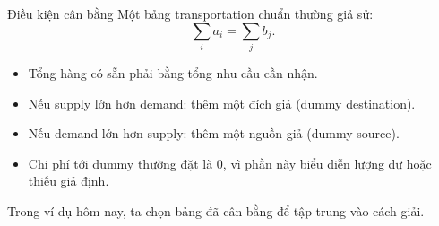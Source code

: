 \documentclass[10pt]{beamer}
\begin{document}
\begin{frame}{Điều kiện cân bằng}
    Một bảng transportation chuẩn thường giả sử:
    \[
        \sum_i a_i = \sum_j b_j.
    \]

    \begin{itemize}
        \item Tổng hàng có sẵn phải bằng tổng nhu cầu cần nhận.
        \item Nếu supply lớn hơn demand: thêm một đích giả (dummy destination).
        \item Nếu demand lớn hơn supply: thêm một nguồn giả (dummy source).
        \item Chi phí tới dummy thường đặt là $0$, vì phần này biểu diễn lượng dư hoặc thiếu giả định.
    \end{itemize}

    Trong ví dụ hôm nay, ta chọn bảng đã cân bằng để tập trung vào cách giải.
\end{frame}
\end{document}
